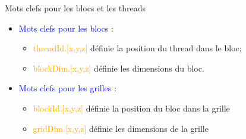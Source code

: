 \documentclass{beamer}
\begin{document}
\begin{frame}[containsverbatim]{Mots clefs pour les blocs et les threads}
\begin{minipage}{5cm}
\begin{itemize}
\item \textcolor{blue}{Mots clefs pour les blocs} :
  \begin{itemize}
  \item \textcolor{orange}{threadId.[x,y,z]} définie la position du thread dans le bloc;
  \item \textcolor{orange}{blockDim.[x,y,z]} définie les dimensions du bloc.
  \end{itemize}
\item \textcolor{blue}{Mots clefs pour les grilles} :
  \begin{itemize}
  \item \textcolor{orange}{blockId.[x,y,z]} définie la position du bloc dans la grille
  \item \textcolor{orange}{gridDim.[x,y,z]} définie les dimensions de la grille
  \end{itemize}
\end{itemize}
\end{minipage}
\begin{minipage}[c]{55mm}
\end{minipage}
\end{frame}
\end{document}
